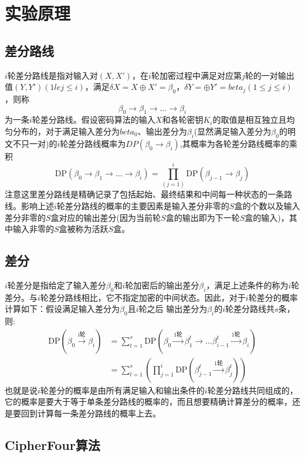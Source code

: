 \section{实验原理}

\subsection{差分路线}
$i$轮差分路线是指对输入对$(X,X')$，在$i$轮加密过程中满足对应第$j$轮的一对输出值$(Y,Y')(1
le j \le i)$，满足$\delta X = X \oplus X' = \beta_0$，$\delta Y =  \oplus Y' = beta_j(1 \le j \le i)$，则称
$$
 \beta_0  \to \beta_1 \to \dots \to \beta_i 
$$
为一条$i$轮差分路线。假设密码算法的输入$X$和各轮密钥$K_i$的取值是相互独立且均匀分布的，对于满足输入差分为$beta_0$、输出差分为$\beta_i$(显然满足输入差分为$\beta_0$的明文不只一对)的$i$轮差分路线概率为$DP(\beta_0 \to \beta_i)$,其概率为各轮差分路线概率的乘积
$$
\text{DP}(\beta_0 \to \beta_1 \to \dots \to \beta_i)  = \prod_{(j=1)}^{i}\text{DP}(\beta_{j-1} \to \beta_j)
$$
注意这里差分路线是精确记录了包括起始、最终结果和中间每一种状态的一条路线。影响上述$i$轮差分路线的概率的主要因素是输入差分非零的$S$盒的个数以及输入差分非零的$S$盒对应的输出差分(因为当前轮$S$盒的输出即为下一轮$S$盒的输入)，其中输入非零的$S$盒被称为活跃$S$盒。

\subsection{差分}
$i$轮差分是指给定了输入差分$\beta_0$和$i$轮加密后的输出差分$\beta_i$，满足上述条件的称为$i$轮差分。与$i$轮差分路线相比，它不指定加密的中间状态。因此，对于$i$轮差分的概率计算如下：假设满足输入差分为$\beta_0$且$i$轮之后
输出差分为$\beta_i$的$i$轮差分路线共$s$条，则:
$$
\begin{aligned}
    \text{DP}(\beta_0 \xrightarrow{\text{i轮}} \beta_i) &= \sum_{t=1}^s \text{DP}( \beta_0 \xrightarrow{\text{1轮}} \beta_1^t \to \dots \beta_{i-1}^t \xrightarrow{\text{1轮}} \beta_i)\\
                                                        &= \sum_{t=1}^s (\prod_{j=1}^i \text{DP} (\beta_{j-1}^t \xrightarrow{\text{1轮}} \beta_j^t))
\end{aligned}
$$
也就是说$i$轮差分的概率是由所有满足输入和输出条件的$i$轮差分路线共同组成的，它的概率是要大于等于单条差分路线的概率的，而且想要精确计算差分的概率，还是要回到计算每一条差分路线的概率上去。

\subsection{CipherFour算法}

